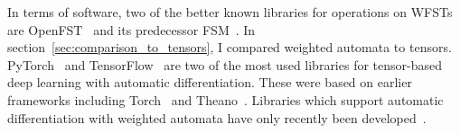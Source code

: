 In terms of software, two of the better known libraries for operations on WFSTs
are OpenFST~\citep{allauzen2007openfst} and its predecessor
FSM~\citep{mohri2000design}. In section~\ref{sec:comparison_to_tensors}, I
compared weighted automata to tensors. PyTorch~\citep{paszke2019pytorch} and
TensorFlow~\citep{abadi2016tensorflow} are two of the most used libraries for
tensor-based deep learning with automatic differentiation. These were based on
earlier frameworks including Torch~\citep{collobert2011torch7} and
Theano~\citep{bergstra2010theano}. Libraries which support automatic
differentiation with weighted automata have only recently been
developed~\citep{k2, hannun2020differentiable}.
